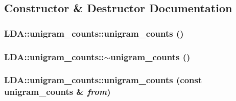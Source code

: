 \subsection{Constructor \& Destructor Documentation}
\hypertarget{class_l_d_a_1_1unigram__counts_a9968a54fca05e2d01f60d8abf41aad75}{
\subsubsection[{unigram\_\-counts}]{\setlength{\rightskip}{0pt plus 5cm}LDA::unigram\_\-counts::unigram\_\-counts ()}}
\label{class_l_d_a_1_1unigram__counts_a9968a54fca05e2d01f60d8abf41aad75}
\hypertarget{class_l_d_a_1_1unigram__counts_a9121992c8cbfc0ef523ff5eee79f21cd}{
\subsubsection[{$\sim$unigram\_\-counts}]{\setlength{\rightskip}{0pt plus 5cm}LDA::unigram\_\-counts::$\sim$unigram\_\-counts ()}}
\label{class_l_d_a_1_1unigram__counts_a9121992c8cbfc0ef523ff5eee79f21cd}
\hypertarget{class_l_d_a_1_1unigram__counts_aa712b911cd9318281022415970e5cc95}{
\subsubsection[{unigram\_\-counts}]{\setlength{\rightskip}{0pt plus 5cm}LDA::unigram\_\-counts::unigram\_\-counts (const {\bf unigram\_\-counts} \& {\em from})}}
\label{class_l_d_a_1_1unigram__counts_aa712b911cd9318281022415970e5cc95}


